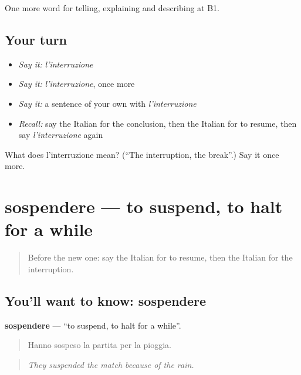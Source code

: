 \begin{grammarlens}[title={What you've built}]
One more word for telling, explaining and describing at B1.
\end{grammarlens}

\subsection*{Your turn}
\begin{itemize}
\raggedright
  \item \emph{Say it:} \emph{l'interruzione}
  \item \emph{Say it:} \emph{l'interruzione}, once more
  \item \emph{Say it:} a sentence of your own with \emph{l'interruzione}
  \item \emph{Recall:} say the Italian for the conclusion, then the Italian for to resume, then say \emph{l'interruzione} again
\end{itemize}

\begin{tcolorbox}[breakable,colback=teal!4,colframe=teal!35!black,title={Before you move on}]
What does l'interruzione mean? (\textquotedblleft{}The interruption, the break\textquotedblright{}.) Say it once more.
\end{tcolorbox}
\section[sospendere]{sospendere — to suspend, to halt for a while}

\label{lesson:IT-C279-sospendere}



\begin{quote}
Before the new one: say the Italian for to resume, then the Italian for the interruption.
\end{quote}

\subsection*{You'll want to know: sospendere}
\textbf{sospendere} — \textquotedblleft{}to suspend, to halt for a while\textquotedblright{}.

\begin{quote}
Hanno sospeso la partita per la pioggia.
\end{quote}

\begin{quote}
\emph{They suspended the match because of the rain.}
\end{quote}

